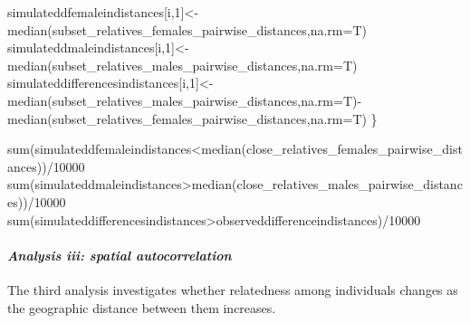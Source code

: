 \documentclass[
]{article}
\newenvironment{Shaded}{\begin{snugshade}}{\end{snugshade}}
\newcommand{\AttributeTok}[1]{\textcolor[rgb]{0.77,0.63,0.00}{#1}}
\newcommand{\DecValTok}[1]{\textcolor[rgb]{0.00,0.00,0.81}{#1}}
\newcommand{\FunctionTok}[1]{\textcolor[rgb]{0.00,0.00,0.00}{#1}}
\newcommand{\NormalTok}[1]{#1}
\newcommand{\OtherTok}[1]{\textcolor[rgb]{0.56,0.35,0.01}{#1}}
\newcommand{\SpecialCharTok}[1]{\textcolor[rgb]{0.00,0.00,0.00}{#1}}
\begin{document}
\begin{Shaded}
\begin{Highlighting}[]
\NormalTok{simulateddfemaleindistances[i,}\DecValTok{1}\NormalTok{]}\OtherTok{\textless{}{-}}\FunctionTok{median}\NormalTok{(subset\_relatives\_females\_pairwise\_distances,}\AttributeTok{na.rm=}\NormalTok{T)}
\NormalTok{simulateddmaleindistances[i,}\DecValTok{1}\NormalTok{]}\OtherTok{\textless{}{-}}\FunctionTok{median}\NormalTok{(subset\_relatives\_males\_pairwise\_distances,}\AttributeTok{na.rm=}\NormalTok{T)}
\NormalTok{simulateddifferencesindistances[i,}\DecValTok{1}\NormalTok{]}\OtherTok{\textless{}{-}}\FunctionTok{median}\NormalTok{(subset\_relatives\_males\_pairwise\_distances,}\AttributeTok{na.rm=}\NormalTok{T)}\SpecialCharTok{{-}}\FunctionTok{median}\NormalTok{(subset\_relatives\_females\_pairwise\_distances,}\AttributeTok{na.rm=}\NormalTok{T)}
\NormalTok{  \}}

\FunctionTok{sum}\NormalTok{(simulateddfemaleindistances}\SpecialCharTok{\textless{}}\FunctionTok{median}\NormalTok{(close\_relatives\_females\_pairwise\_distances))}\SpecialCharTok{/}\DecValTok{10000}
\FunctionTok{sum}\NormalTok{(simulateddmaleindistances}\SpecialCharTok{\textgreater{}}\FunctionTok{median}\NormalTok{(close\_relatives\_males\_pairwise\_distances))}\SpecialCharTok{/}\DecValTok{10000}
\FunctionTok{sum}\NormalTok{(simulateddifferencesindistances}\SpecialCharTok{\textgreater{}}\NormalTok{observeddifferenceindistances)}\SpecialCharTok{/}\DecValTok{10000}
\end{Highlighting}
\end{Shaded}

\hypertarget{analysis-iii-spatial-autocorrelation-2}{%
\paragraph{\texorpdfstring{\emph{Analysis iii: spatial
autocorrelation}}{Analysis iii: spatial autocorrelation}}\label{analysis-iii-spatial-autocorrelation-2}}

The third analysis investigates whether relatedness among individuals
changes as the geographic distance between them increases.
\end{document}
